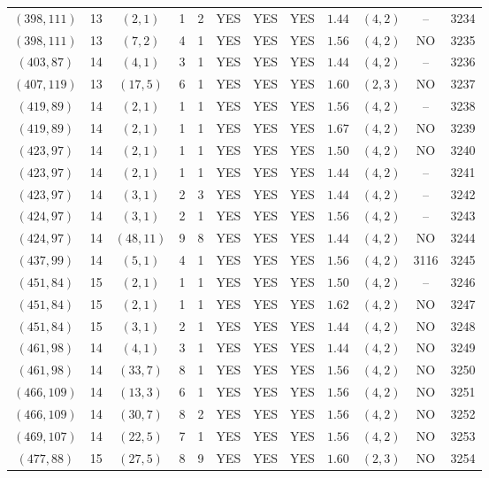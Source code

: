 \begin{longtable}{|c|c|c|c|c|c|c|c|c|c|c|c|}
$(398,111)$ & 13 & $(2,1)$ & 1 & 2 & YES & YES & YES & $1.44$ & $(4,2)$ & -- & 3234\\
$(398,111)$ & 13 & $(7,2)$ & 4 & 1 & YES & YES & YES & $1.56$ & $(4,2)$ & NO & 3235\\
$(403,87)$ & 14 & $(4,1)$ & 3 & 1 & YES & YES & YES & $1.44$ & $(4,2)$ & -- & 3236\\
$(407,119)$ & 13 & $(17,5)$ & 6 & 1 & YES & YES & YES & $1.60$ & $(2,3)$ & NO & 3237\\
$(419,89)$ & 14 & $(2,1)$ & 1 & 1 & YES & YES & YES & $1.56$ & $(4,2)$ & -- & 3238\\
$(419,89)$ & 14 & $(2,1)$ & 1 & 1 & YES & YES & YES & $1.67$ & $(4,2)$ & NO & 3239\\
$(423,97)$ & 14 & $(2,1)$ & 1 & 1 & YES & YES & YES & $1.50$ & $(4,2)$ & NO & 3240\\
$(423,97)$ & 14 & $(2,1)$ & 1 & 1 & YES & YES & YES & $1.44$ & $(4,2)$ & -- & 3241\\
$(423,97)$ & 14 & $(3,1)$ & 2 & 3 & YES & YES & YES & $1.44$ & $(4,2)$ & -- & 3242\\
$(424,97)$ & 14 & $(3,1)$ & 2 & 1 & YES & YES & YES & $1.56$ & $(4,2)$ & -- & 3243\\
$(424,97)$ & 14 & $(48,11)$ & 9 & 8 & YES & YES & YES & $1.44$ & $(4,2)$ & NO & 3244\\
$(437,99)$ & 14 & $(5,1)$ & 4 & 1 & YES & YES & YES & $1.56$ & $(4,2)$ & 3116 & 3245\\
$(451,84)$ & 15 & $(2,1)$ & 1 & 1 & YES & YES & YES & $1.50$ & $(4,2)$ & -- & 3246\\
$(451,84)$ & 15 & $(2,1)$ & 1 & 1 & YES & YES & YES & $1.62$ & $(4,2)$ & NO & 3247\\
$(451,84)$ & 15 & $(3,1)$ & 2 & 1 & YES & YES & YES & $1.44$ & $(4,2)$ & NO & 3248\\
$(461,98)$ & 14 & $(4,1)$ & 3 & 1 & YES & YES & YES & $1.44$ & $(4,2)$ & NO & 3249\\
$(461,98)$ & 14 & $(33,7)$ & 8 & 1 & YES & YES & YES & $1.56$ & $(4,2)$ & NO & 3250\\
$(466,109)$ & 14 & $(13,3)$ & 6 & 1 & YES & YES & YES & $1.56$ & $(4,2)$ & NO & 3251\\
$(466,109)$ & 14 & $(30,7)$ & 8 & 2 & YES & YES & YES & $1.56$ & $(4,2)$ & NO & 3252\\
$(469,107)$ & 14 & $(22,5)$ & 7 & 1 & YES & YES & YES & $1.56$ & $(4,2)$ & NO & 3253\\
$(477,88)$ & 15 & $(27,5)$ & 8 & 9 & YES & YES & YES & $1.60$ & $(2,3)$ & NO & 3254\\

\end{longtable}
